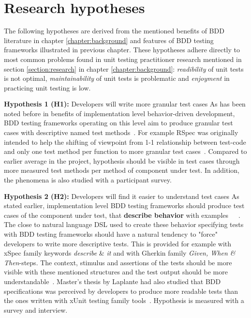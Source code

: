 \section{Research hypotheses}
    The following hypotheses are derived from the mentioned benefits of BDD literature in chapter \ref{chapter:background} and features of BDD
    testing frameworks illustrated in previous chapter. These hypotheses adhere directly to most common problems found in unit
    testing practitioner research mentioned in section \ref{section:research} in chapter \ref{chapter:background}:
    \textit{readibility} of unit tests is not optimal, \textit{maintainability} of unit tests is problematic and \textit{enjoyment}
    in practicing unit testing is low.
    \begin{addmargin}[0em]{0em}
    \vspace{10px}
    \textbf{Hypothesis 1 (H1):} Developers will write more granular test cases
    \vspace{5px}
    \newline
    As has been noted before in benefits of implementation level behavior-driven development, BDD testing frameworks operating on this
    level aim to produce granular test cases with descriptive named test methods~\cite{chelimsky2010rspec, astels2006new, kapelonis2016java}.
    For example RSpec was originally intended to help the shifting of viewpoint from 1-1 relationship between test-code
    and only one test method per function to more granular test cases~\cite{astels2006new}.
    Compared to earlier average in the project, hypothesis should be visible in test cases through more measured test methods
    per method of component under test. In addition, the phenomena is also studied with a participant survey.
    \end{addmargin}

    \begin{addmargin}[0em]{0em}
    \vspace{10px}
    \textbf{Hypothesis 2 (H2):} Developers will find it easier to understand test cases
    \vspace{5px}
    \newline
    As stated earlier, implementation level BDD testing frameworks should produce test cases of the component under test,
    that \textbf{describe behavior} with examples~\cite{chelimsky2010rspec}~\cite{astels2006new}~\cite{amodeo2015learning}.
    The close to natural language DSL used to create these behavior specifying tests with BDD testing frameworks should
    have a natural tendency to "force" developers to write more descriptive tests. This is provided for example
    with xSpec family keywords \textit{describe} \& \textit{it} and with Gherkin family \textit{Given, When \& Then}-steps.
    The context, stimulus and assertions of the tests should be more visible with these mentioned structures and the test output
    should be more understandable~\cite{smart2014bdd}. Master's thesis by Laplante had also studied that BDD specifications
    was perceived by developers to produce more readable tests than the ones written with xUnit testing family tools~\cite{laplante2009behavior}.
    Hypothesis is measured with a survey and interview.
    \end{addmargin}


